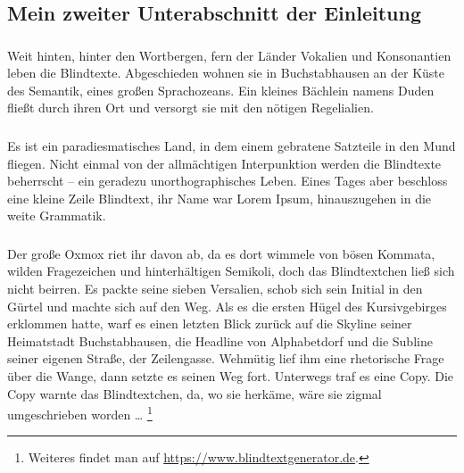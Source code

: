 \subsection*{Mein zweiter Unterabschnitt der Einleitung}
\subsubsection{}
Weit hinten, hinter den Wortbergen, fern der Länder Vokalien und Konsonantien leben die Blindtexte. 
Abgeschieden wohnen sie in Buchstabhausen an der Küste des Semantik, eines großen Sprachozeans. 
Ein kleines Bächlein namens Duden fließt durch ihren Ort und versorgt sie mit den nötigen Regelialien. 
\subsubsection{}
Es ist ein paradiesmatisches Land, in dem einem gebratene Satzteile in den Mund fliegen. 
Nicht einmal von der allmächtigen Interpunktion werden die Blindtexte beherrscht -- ein geradezu unorthographisches Leben. 
Eines Tages aber beschloss eine kleine Zeile Blindtext, ihr Name war Lorem Ipsum, hinauszugehen in die weite Grammatik. 
\subsubsection{}
Der große Oxmox riet ihr davon ab, da es dort wimmele von bösen Kommata, wilden Fragezeichen und hinterhältigen Semikoli, doch das Blindtextchen ließ sich nicht beirren. 
Es packte seine sieben Versalien, schob sich sein Initial in den Gürtel und machte sich auf den Weg. 
Als es die ersten Hügel des Kursivgebirges erklommen hatte, warf es einen letzten Blick zurück auf die Skyline seiner Heimatstadt Buchstabhausen, die Headline von Alphabetdorf und die Subline seiner eigenen Straße, der Zeilengasse. 
Wehmütig lief ihm eine rhetorische Frage über die Wange, dann setzte es seinen Weg fort. 
Unterwegs traf es eine Copy.
Die Copy warnte das Blindtextchen, da, wo sie herkäme, wäre sie zigmal umgeschrieben worden \ldots%
\footnote{Weiteres findet man auf \url{https://www.blindtextgenerator.de}.}
